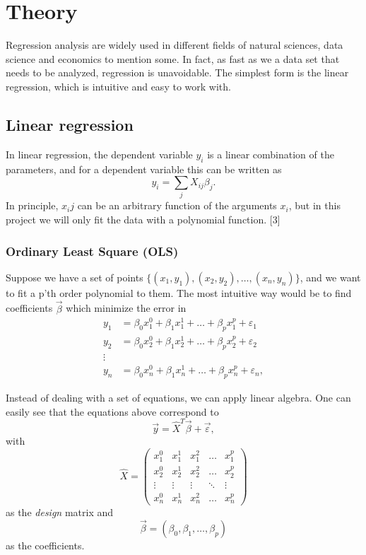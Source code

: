 \section{Theory} \label{sec:theory}
Regression analysis are widely used in different fields of natural sciences, data science and economics to mention some. In fact, as fast as we a data set that needs to be analyzed, regression is unavoidable. The simplest form is the linear regression, which is intuitive and easy to work with. 
 
\subsection{Linear regression} \label{sec:regression}
In linear regression, the dependent variable $y_i$ is a linear combination of the parameters, and for a dependent variable this can be written as
\begin{equation}
y_i=\sum_jX_{ij}\beta_j.
\end{equation}
In principle, $x_ij$ can be an arbitrary function of the arguments $x_i$, but in this project we will only fit the data with a polynomial function. [3]

\subsubsection{Ordinary Least Square (OLS)} \label{sec:OLS}
Suppose we have a set of points $\{(x_1, y_1), (x_2, y_2),\hdots, (x_n, y_n)\}$, and we want to fit a p'th order polynomial to them. The most intuitive way would be to find coefficients $\vec{\beta}$ which minimize the error in
\begin{align*}
y_1&=\beta_0x_1^0+\beta_1x_1^1+\hdots+\beta_px_1^p+\varepsilon_1\\
y_2&=\beta_0x_2^0+\beta_1x_2^1+\hdots+\beta_px_2^p+\varepsilon_2\\
\vdots\\
y_n&=\beta_0x_n^0+\beta_1x_n^1+\hdots+\beta_px_n^p+\varepsilon_n,
\end{align*}

Instead of dealing with a set of equations, we can apply linear algebra. One can easily see that the equations above correspond to
\begin{equation}
\vec{y}=\hat{X}^T\vec{\beta}+\vec{\varepsilon},
\label{eq:y_xb}
\end{equation}
with
\begin{equation}
\hat{X}=\begin{pmatrix}
x_1^0&x_1^1&x_1^2&\hdots&x_1^p\\
x_2^0&x_2^1&x_2^2&\hdots&x_2^p\\
\vdots&\vdots&\vdots&\ddots&\vdots\\
x_n^0&x_n^1&x_n^2&\hdots&x_n^p
\end{pmatrix}
\end{equation}
as the \textit{design} matrix and
\begin{equation}
\vec{\beta}=(\beta_0, \beta_1, \hdots, \beta_p)
\end{equation}
as the coefficients. 

